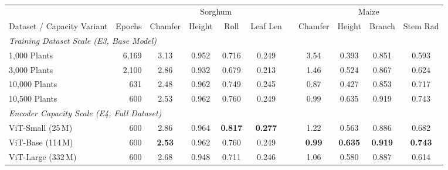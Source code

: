\begin{table}[t]
  \centering\scriptsize
  \setlength{\tabcolsep}{3.0pt}
  \begin{tabular}{l r c ccc c c ccc}
    \toprule
    & & \multicolumn{4}{c}{Sorghum} & & \multicolumn{4}{c}{Maize} \\
    \cmidrule(lr){3-6}\cmidrule(lr){8-11}
    Dataset / Capacity Variant & Epochs & Chamfer & Height & Roll & Leaf Len & & Chamfer & Height & Branch & Stem Rad \\
    \midrule
    \multicolumn{11}{l}{\emph{Training Dataset Scale (E3, Base Model)}} \\
    1{,}000 Plants & 6{,}169 & 3.13 & 0.952 & 0.716 & 0.249 & & 3.54 & 0.393 & 0.851 & 0.593 \\
    3{,}000 Plants & 2{,}100 & 2.86 & 0.932 & 0.679 & 0.213 & & 1.46 & 0.524 & 0.867 & 0.624 \\
    10{,}000 Plants & 631 & 2.48 & 0.962 & 0.749 & 0.245 & & 0.87 & 0.427 & 0.853 & 0.717 \\
    10{,}500 Plants & 600 & 2.53 & 0.962 & 0.760 & 0.249 & & 0.99 & 0.635 & 0.919 & 0.743 \\
    \midrule
    \multicolumn{11}{l}{\emph{Encoder Capacity Scale (E4, Full Dataset)}} \\
    ViT-Small (25\,M) & 600 & 2.86 & 0.964 & \textbf{0.817} & \textbf{0.277} & & 1.22 & 0.563 & 0.886 & 0.682 \\
    ViT-Base (114\,M) & 600 & \textbf{2.53} & 0.962 & 0.760 & 0.249 & & \textbf{0.99} & \textbf{0.635} & \textbf{0.919} & \textbf{0.743} \\
    ViT-Large (332\,M) & 600 & 2.68 & 0.948 & 0.711 & 0.246 & & 1.06 & 0.580 & 0.887 & 0.614 \\
    \bottomrule
  \end{tabular}
  \caption{}
  \label{tab:scaling}\label{tab:scaling_ablations}
\end{table}

